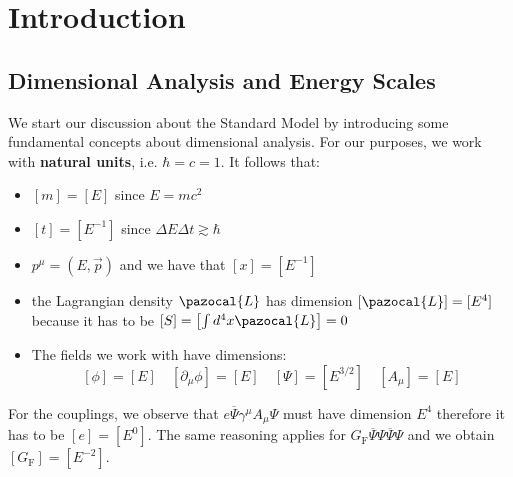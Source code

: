 \documentclass[../main.tex]{subfiles}
\begin{document}
\setchapterpreamble[u]{\margintoc}
\chapter[Introduction]{Introduction\footnotemark[0]}
\section{Dimensional Analysis and Energy Scales}
We start our discussion about the Standard Model by introducing some fundamental concepts about dimensional analysis. For our purposes, we work with \textbf{natural units}, i.e. $\hbar=c=1$. It follows that:
\begin{itemize}
    \item $[m]=[E]$ since $E=mc^2$ 
    \item $[t]=[E^{-1}]$ since $\Delta E\Delta t\gtrsim\hbar$
    \item $p^\mu=(E,\Vec{p})$ and we have that $[x]=[E^{-1}]$
    \item the Lagrangian density $\pazocal{L}$ has dimension $[\pazocal{L}]=[E^4]$ because it has to be $[S]=\left[\int d^4x\pazocal{L}\right]=0$
    \item The fields we work with have dimensions:
    \[
    [\phi]=[E] \quad [\partial_\mu\phi]=[E] \quad [\Psi]=[E^{3/2}] \quad [A_\mu]=[E]
    \]
\end{itemize}
For the couplings, we observe that $e\overline{\Psi}\gamma^\mu A_\mu\Psi$ must have dimension $E^4$ therefore it has to be $[e]=[E^0]$. The same reasoning applies for $G_{\text{F}}\overline{\Psi}\Psi\overline{\Psi}\Psi$ and we obtain $[G_{\text{F}}]=[E^{-2}]$.
\end{document}
